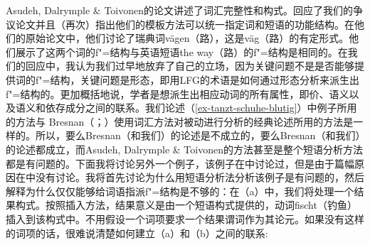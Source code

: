 \addlines
Asudeh, Dalrymple \& Toivonen的论文讲述了词汇完整性和构式。\citet{AT2014a}回应了我们的争议论文并且（再次）指出他们的模板方法可以统一指定词和短语的功能结构。在他们的原始论文中，他们讨论了瑞典词vägen（路），这是väg（路）的有定形式。他们展示了这两个词的f"=结构与英语短语the way（路）的f"=结构是相同的。在我们的回应\citeyearpar{MWArgStReply}中，我认为我们过早地放弃了自己的立场，因为关键问题不是是否能够提供词的f"=结构，关键问题是形态，即用LFG的术语是如何通过形态分析来派生出f"=结构的。更加概括地说，学者是想派生出相应动词的所有属性，即价、语义以及语义和依存成分之间的联系。我们论述（\ref{ex-tanzt-schuhe-blutig}）中例子所用的方法与 Bresnan（\citeyear[]{Bresnan82a}；\citeyear[]{Bresnan2001a}）使用词汇方法对被动进行分析的经典论述所用的方法是一样的。所以，要么Bresnan（和我们）的论述是不成立的，要么Bresnan（和我们）的论述都成立，而Asudeh, Dalrymple \& Toivonen的方法甚至是整个短语分析方法都是有问题的。下面我将讨论另外一个例子，该例子在中讨论过，但是由于篇幅原因在中没有讨论。我将首先讨论为什么用短语分析法分析该例子是有问题的，然后解释为什么仅仅能够给词语指派f"=结构是不够的：在（a）中，我们将处理一个结果构式。按照插入方法，结果意义是由一个短语构式提供的，动词fischt（钓鱼）插入到该构式中。不用假设一个词项要求一个结果谓词作为其论元。如果没有这样的词项的话，很难说清楚如何建立（a）和（b）之间的联系:
